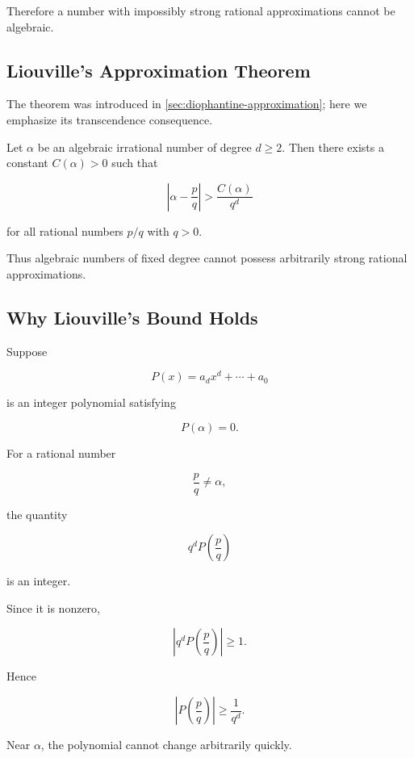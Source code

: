 Therefore a number with impossibly strong rational approximations cannot be
algebraic.

\subsection{Liouville's Approximation Theorem}
\label{subsec:liouville-theorem-transcendence}

The theorem was introduced in
\cref{sec:diophantine-approximation}; here we emphasize its transcendence
consequence.

\begin{theorem}[Liouville]
Let \(\alpha\) be an algebraic irrational number of degree \(d\geq2\).
Then there exists a constant \(C(\alpha)>0\) such that

\[ \boxed{\left|\alpha-\frac pq\right|>\frac{C(\alpha)}{q^d}} \]

for all rational numbers \(p/q\) with \(q>0\).
\end{theorem}

Thus algebraic numbers of fixed degree cannot possess arbitrarily strong
rational approximations.

\subsection{Why Liouville's Bound Holds}
\label{subsec:liouville-bound-idea}

Suppose

\[ P(x)=a_dx^d+\cdots+a_0 \]

is an integer polynomial satisfying

\[ P(\alpha)=0. \]

For a rational number

\[ \frac pq\neq\alpha, \]

the quantity

\[ q^dP\left(\frac pq\right) \]

is an integer.

Since it is nonzero,

\[ \left|q^dP\left(\frac pq\right)\right|\geq1. \]

Hence

\[ \left|P\left(\frac pq\right)\right|\geq\frac1{q^d}. \]

Near \(\alpha\), the polynomial cannot change arbitrarily quickly.

